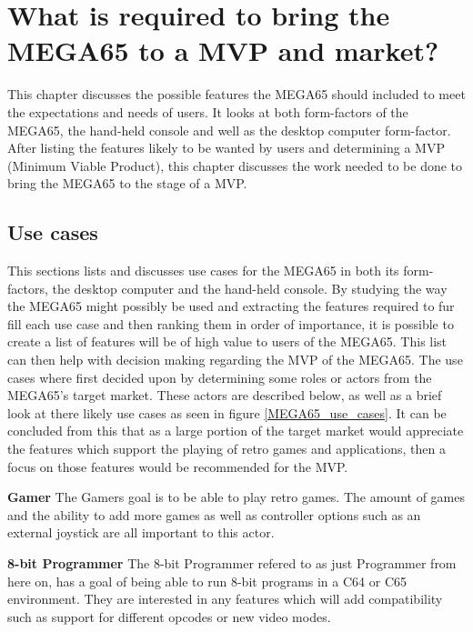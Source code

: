 
\chapter{What is required to bring the MEGA65 to a MVP and market?}
\label{Chapter7}
This chapter discusses the possible features the MEGA65 should included to meet the expectations and needs of users. It looks at both form-factors of the MEGA65, the hand-held console and well as the desktop computer form-factor. After listing the features likely to be wanted by users and determining a MVP (Minimum Viable Product), this chapter discusses the work needed to be done to bring the MEGA65 to the stage of a MVP.


\section{Use cases}
This sections lists and discusses use cases for the MEGA65 in both its form-factors, the desktop computer and the hand-held console. By studying the way the MEGA65 might possibly be used and extracting the features required to fur fill each use case and then ranking them in order of importance, it is possible to create a list of features will be of high value to users of the MEGA65. This list can then help with decision making regarding the MVP of the MEGA65. The use cases where first decided upon by determining some roles or actors from the MEGA65's target market. These actors are described below, as well as a brief look at there likely use cases as seen in figure \ref{MEGA65_use_cases}. It can be concluded from this that as a large portion of the target market would appreciate the features which support the playing of retro games and applications, then a focus on those features would be recommended for the MVP.

\textbf{Gamer}
The Gamers goal is to be able to play retro games. The amount of games and the ability to add more games as well as controller options such as an external joystick are all important to this actor.

\textbf{8-bit Programmer}
The 8-bit Programmer refered to as just Programmer from here on, has a goal of being able to run 8-bit programs in a C64 or C65 environment. They are interested in any features which will add compatibility such as support for different opcodes or new video modes. 

